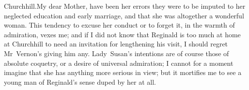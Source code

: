 \begin{mail}{Churchhill.}{My dear Mother,}
have been her errors they were to be imputed to her neglected education and early marriage, and that she was altogether a wonderful woman. This tendency to excuse her conduct or to forget it, in the warmth of admiration, vexes me; and if I did not know that Reginald is too much at home at Churchhill to need an invitation for lengthening his visit, I should regret Mr~Vernon's giving him any. Lady~Susan's intentions are of course those of absolute coquetry, or a desire of universal admiration; I cannot for a moment imagine that she has anything more serious in view; but it mortifies me to see a young man of Reginald's sense duped by her at all. 

\end{mail}